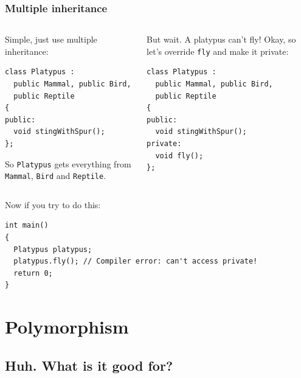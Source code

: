\documentclass{beamer}
\begin{document}
\begin{frame}[fragile]
  \frametitle{Multiple inheritance}
  
  \begin{columns}[t]
    \begin{column}[T]{0.49\linewidth}
  		Simple, just use multiple inheritance:
  		\begin{lstlisting}
class Platypus :
  public Mammal, public Bird,
  public Reptile
{
public:
  void stingWithSpur();
};
  		\end{lstlisting}
  		So \texttt{Platypus} gets everything from \texttt{Mammal}, \texttt{Bird} and \texttt{Reptile}.
  	\end{column}
  	\pause
  	\begin{column}[T]{0.49\linewidth}
	  	But wait.  A platypus can't fly! \pause{}  Okay, so let's override \texttt{fly} and make it private:
		  \begin{lstlisting}
class Platypus :
  public Mammal, public Bird,
  public Reptile
{
public:
  void stingWithSpur();
private:
  void fly();
};
  		\end{lstlisting}  
  	\end{column}
  \end{columns}
  \pause
  		Now if you try to do this:
  		\begin{lstlisting}[belowskip=0pt]
int main()
{
  Platypus platypus;
  platypus.fly(); // Compiler error: can't access private!
  return 0;
}
  		\end{lstlisting}
  

\end{frame}

\section{Polymorphism}

\subsection{Huh.  What is it good for?}
\end{document}
